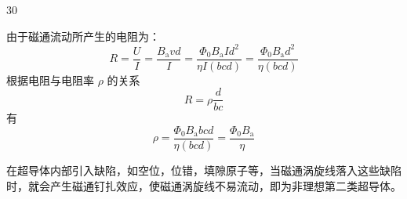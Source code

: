 \begin{solution}{30}
\begin{subsolution}
\begin{equation}
    \end{equation}
    由于磁通流动所产生的电阻为：
    \begin{equation}
      R = \frac{U}{I} = \frac{B_{\mathrm{a}} v d}{I} = \frac{\Phi_{0} B_{\mathrm{a}} I d^{2}}{\eta I (b c d)} = \frac{\Phi_{0} B_{\mathrm{a}} d^{2}}{\eta (b c d)}
      \label{eq:9.p30}
    \end{equation}
    根据电阻与电阻率 $\rho$ 的关系
    \begin{equation}
      R = \rho \frac{d}{b c}
      \label{eq:10.p30}
    \end{equation}
    有
    \begin{equation}
      \rho = \frac{\Phi_{0} B_{\mathrm{a}} b c d}{\eta (b c d)} = \frac{\Phi_{0} B_{\mathrm{a}}}{\eta}
      \label{eq:11.p30}
    \end{equation}
  \end{subsolution}
  \begin{subsolution}
    在超导体内部引入缺陷，如空位，位错，填隙原子等，当磁通涡旋线落入这些缺陷时，就会产生磁通钉扎效应，使磁通涡旋线不易流动，即为非理想第二类超导体。
  \end{subsolution}
\end{solution}